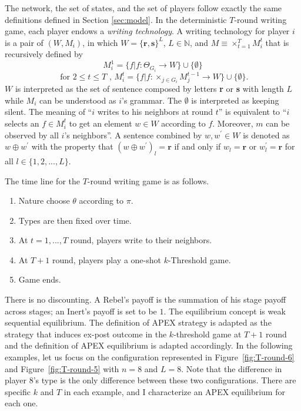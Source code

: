 \documentclass[12pt,letter]{article}
\theoremstyle{definition}
\theoremstyle{remark}
\theoremstyle{claim}
\begin{document}
The network, the set of states, and the set of players follow exactly the same definitions defined in Section \ref{sec:model}. In the deterministic $T$-round writing game, each player endows a \textit{writing technology}. A writing technology for player $i$ is a pair of $(W,M_i)$, in which $W=\{{\textbf{r}},\textbf{s}\}^L$, $L\in \mathbb{N}$, and $M\equiv \times^T_{t=1}M^{t}_i$ that is  recursively defined by
\[M^1_i=\{f|f:\Theta_{G_i}\rightarrow W\}\cup \{\emptyset\}\]
\[ \text{ for } 2\leq t \leq T\text{ , }M^{t}_i=\{f|f:\times_{j\in G_i}M^{t-1}_j\rightarrow W\}\cup \{\emptyset\}. \]
$W$ is interpreted as the set of sentence composed by letters \textbf{r} or \textbf{s} with length $L$ while $M_i$ can be understood as $i$'s grammar. The $\emptyset$ is interpreted as keeping silent. The meaning of ``$i$ writes to his neighbors at round $t$'' is equivalent to ``$i$ selects an $f\in M^t_i$ to get an element $w\in W$ according to $f$.  Moreover, $m$ can be observed by all $i$'s neighbors''. A sentence combined by $w,w^{'}\in W$ is denoted as $w\oplus w^{'}$ with the property that $(w\oplus w^{'})_l=\textbf{r}$ if and only if $w_l=\textbf{r}$ or $w^{'}_l=\textbf{r}$ for all $l\in \{1,2,...,L\}$. 

The time line for the $T$-round writing game is as follows.
\begin{enumerate}
\item Nature choose $\theta$ according to $\pi$.
\item Types are then fixed over time.
\item At $t=1,...,T$ round, players write to their neighbors. 
\item At $T+1$ round, players play a one-shot $k$-Threshold game.
\item Game ends.
\end{enumerate}

There is no discounting. A Rebel's payoff is the summation of his stage payoff across stages; an Inert's payoff is set to be $1$. The equilibrium concept is weak sequential equilibrium. The definition of APEX strategy is adapted as the strategy that induces ex-post outcome in the $k$-threshold game at $T+1$ round and the definition of APEX equilibrium is adapted accordingly. In the following examples, let us focus on the configuration represented in Figure~\ref{fig:T-round-6} and Figure~\ref{fig:T-round-5} with $n=8$ and $L=8$. Note that the difference in player 8's type is the only difference between these two configurations. There are specific $k$ and $T$ in each example, and I characterize an APEX equilibrium for each one.
\end{document}
